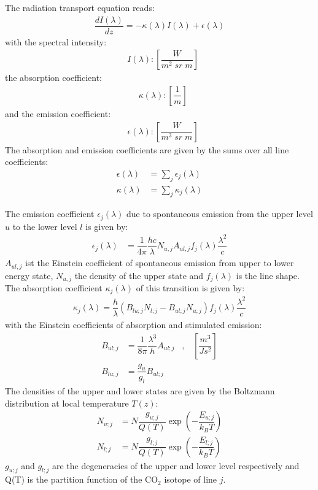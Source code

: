 The radiation transport equation reads:
\begin{align}
	\label{eqn1}
	\dfrac{d I(\lambda)}{dz} = - \kappa(\lambda) I(\lambda) + \epsilon(\lambda)
\end{align}
with the spectral intensity:
\begin{align*}
	&I(\lambda)    : \left[\dfrac{W}{m^2 \; sr \; m}\right]
\end{align*}
the absorption coefficient:
\begin{align*}
	&\kappa(\lambda)   : \left[\dfrac{1}{m}\right]
\end{align*}
and the emission coefficient:
\begin{align*}
	&\epsilon(\lambda) : \left[\dfrac{W}{m^3 \; sr \; m}\right]
\end{align*}
The absorption and emission coefficients are given by the sums over all 
line coefficients:
\begin{align*}
	\epsilon(\lambda) &= \sum_j \epsilon_j(\lambda) \\
	\kappa(\lambda) &= \sum_j \kappa_j(\lambda)
\end{align*}

The emission coefficient $\epsilon_j(\lambda)$ due to spontaneous emission from the upper level $u$ to the lower level $l$ is given by:
\begin{align}
	\epsilon_j(\lambda) &= \dfrac{1}{4 \pi} \dfrac{h c}{\lambda} N_{u,j} A_{ul,j} f_j(\lambda)
	 \dfrac{\lambda^2}{c}
\end{align}
$A_{ul,j}$ ist the Einstein coefficient of spontaneous emission from upper to lower energy state, $N_{u,j} $ the density of the upper state and $f_j(\lambda)$ is the line shape. The absorption coefficient $\kappa_j(\lambda)$ of this transition is given by:
\begin{align}
	\kappa_j(\lambda)  = \dfrac{h}{\lambda}  \left(  B_{lu;j} N_{l;j} -  B_{ul;j} N_{u;j} \right) f_j(\lambda)
	 \dfrac{\lambda^2}{c}
\end{align}
with the Einstein coefficients of absorption and stimulated emission:
\begin{align}
	B_{ul;j} &= \dfrac{1}{8 \pi} \dfrac{\lambda^3}{h} A_{ul;j} \;\;\; , \;\;\; \left[\dfrac{m^3}{J s^2}\right] \\
	B_{lu;j} &= \dfrac{g_u}{g_l} B_{ul;j}
\end{align}
The densities of the upper and lower states are given by the Boltzmann distribution at local temperature $T(z)$:
\begin{align}
	N_{u;j} &= N \dfrac{g_{u;j}}{Q(T)} \exp\left(- \dfrac{E_{u;j}}{k_B T} \right) \\
	N_{l;j} &= N \dfrac{g_{l;j}}{Q(T)} \exp\left(- \dfrac{E_{l;j}}{k_B T} \right)
\end{align}
$g_{u;j}$ and $g_{l;j}$ are the degeneracies of the upper and lower level respectively and Q(T) is the partition function of the $\mathrm{CO}_2$ isotope of line $j$.



